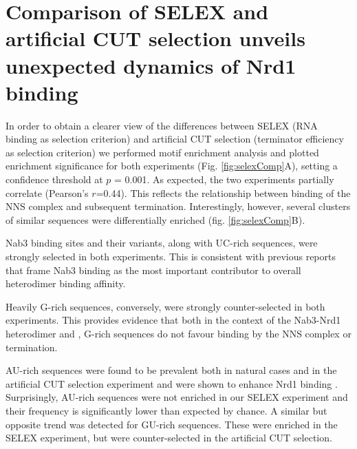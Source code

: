 \section{Comparison of SELEX and \invivo{} artificial CUT selection unveils unexpected dynamics of Nrd1 binding}
\doublespacing
In order to obtain a clearer view of the differences between \invitro{} SELEX (RNA binding as selection criterion) and artificial CUT selection (terminator efficiency as selection criterion) we performed motif enrichment analysis and plotted enrichment significance for both experiments (Fig. \ref{fig:selexComp}A), setting a confidence threshold at $p$ = 0.001. As expected, the two experiments partially correlate (Pearson's $r$=0.44). This reflects the relationship between binding of the NNS complex and subsequent termination. Interestingly, however, several clusters of similar sequences were differentially enriched (fig. \ref{fig:selexComp}B). 

Nab3 binding sites and their variants, along with UC-rich sequences, were strongly selected in both experiments. This is consistent with previous reports that frame Nab3 binding as the most important contributor to overall heterodimer binding affinity.

Heavily G-rich sequences, conversely, were strongly counter-selected in both experiments. This provides evidence that both in the context of the Nab3-Nrd1 heterodimer and \invivo{}, G-rich sequences do not favour binding by the NNS complex or termination.

AU-rich sequences were found to be prevalent both in natural cases and in the artificial CUT selection experiment and were shown to enhance Nrd1 binding \cite{porrua:2012:in}. Surprisingly, AU-rich sequences were not enriched in our SELEX experiment and their frequency is significantly lower than expected by chance. A similar but opposite trend was detected for GU-rich sequences. These were enriched in the SELEX experiment, but were counter-selected in the artificial CUT selection. 

